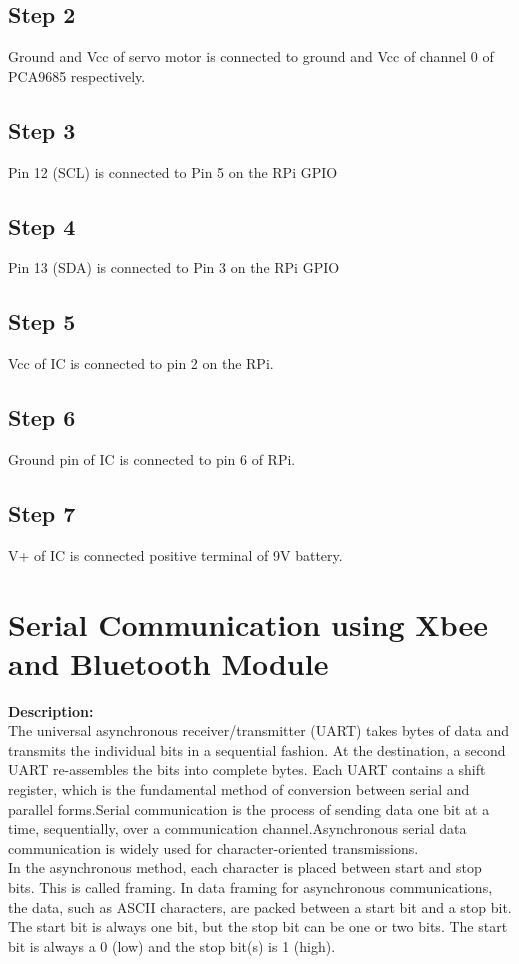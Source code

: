 \documentclass[a4paper,12pt,oneside]{book}
\begin{document}
\subsection*{Step 2}
Ground and Vcc of servo motor is connected to ground and Vcc of channel 0 of PCA9685 respectively. 
\subsection*{Step 3}
Pin 12 (SCL) is connected to Pin 5 on the RPi GPIO
\subsection*{Step 4}
Pin 13 (SDA) is connected to Pin 3 on the RPi GPIO
\subsection*{Step 5}
Vcc of IC is connected to pin 2 on the RPi.
\subsection*{Step 6}
Ground pin of IC is connected to pin 6 of RPi.
\subsection*{Step 7}
V+ of IC is connected positive terminal of 9V battery.

\section{Serial Communication using Xbee and Bluetooth Module}
\textbf{Description:} \\
The universal asynchronous receiver/transmitter (UART) takes bytes of data and transmits the individual bits in a sequential fashion. At the destination, a second UART re-assembles the bits into complete bytes. Each UART contains a shift register, which is the fundamental method of conversion between serial and parallel forms.Serial communication is the process of sending data one bit at a time, sequentially, over a communication channel.Asynchronous serial data communication is widely used for character-oriented transmissions.\\
In the asynchronous method, each character is placed
between start and stop bits. This is called framing. In data framing for asynchronous communications, the data, such as ASCII characters, are packed between a start bit and a stop bit. The start bit is always one bit, but the
stop bit can be one or two bits. The start bit is always a 0 (low) and the
stop bit(s) is 1 (high).
\end{document}
